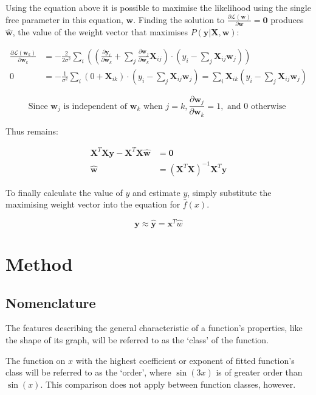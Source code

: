 \documentclass{article}
\newcommand*{\vc}[1]{\ensuremath{\boldsymbol{{#1}}}}
\newcommand*{\mt}[1]{\ensuremath{\boldsymbol{\mathbf{#1}}}
}
\newcommand*{\qt}[1]{`#1'}
\newcommand*{\dd}[2]{\frac{\partial{#1}}{\partial{#2}}}
\begin{document}
Using the equation above it is possible to maximise the likelihood using the single free parameter in this equation, $\vc w$. Finding the solution to $\dd{\mathcal{L}\left({\vc w}\right)}{\vc w}=\vc{0}$ produces $\vc {\hat w}$, the value of the weight vector that maximises $P(\vc y|\mt X, \vc w)$:

\[
  \begin{aligned}
    \dd{\mathcal{L}\left({\vc w_k}\right)}{\vc w_k}
      & = -\frac{2}{2\sigma^2}\sum_i\left(
    \left(\dd{\vc y_i}{\vc w_k}+\sum_j{\dd{\vc w_j}{\vc w_k}\mt X_{ij}}\right)
    \cdot\left(y_i - \sum_j{\mt X_{ij}\vc w_j}\right)
    \right)
    \\
    0 & = - \frac{1}{\sigma^2}\sum_i\left(0 + \mt X_{ik}\right)\cdot(y_i - \sum_j{\mt X_{ij}\vc w_j}) = \sum_i{\mt X_{ik}\left(y_i - \sum_j {\mt X_{ij} \vc w_j} \right)}
  \end{aligned}
\]

\[
  \scriptstyle{\text{Since }\vc w_j \text{ is independent of } \vc w_k \text{ when } j = k, \dd{\vc w_j}{\vc w_k}=1, \text{ and }0\text{ otherwise }}
\]

Thus remains:

\[
  \begin{aligned}
    {\mt X}^T{\mt X}{\vc y}-{\mt X}^T{\mt X}{\vc {\hat w}} & ={\vc 0}                                            \\
    \vc {\hat w}                                           & = \left({\mt X}^T {\mt X}\right)^{-1}{\mt X}^T\vc y
  \end{aligned}
\]

To finally calculate the value of $\hat y$ and estimate $y$, simply substitute the maximising weight vector into the equation for $\hat f(x)$.

\[
  \vc y \approx \vc {\hat y} = {\vc x}^T \hat w
\]

\section{Method}
\label{sec:Method}

\subsection{Nomenclature}

The features describing the general characteristic of a function's properties, like the shape of its graph, will be referred to as the \qt{class} of the function.

The function on $x$ with the highest coefficient or exponent of fitted function's class will be referred to as the \qt{order}, where $\sin(3x)$ is of greater order than $\sin(x)$. This comparison does not apply between function classes, however.
\end{document}

